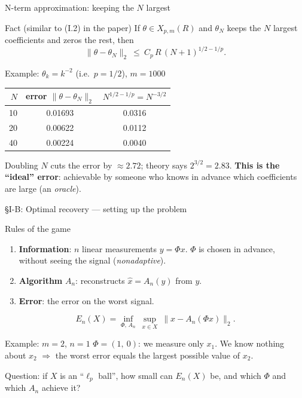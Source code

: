 \documentclass[aspectratio=169,11pt]{beamer}
\newcommand{\en}[1]{\textit{#1}}          %
\newcommand{\norm}[1]{\lVert #1\rVert}
\begin{document}
\begin{frame}{N-term approximation: keeping the $N$ largest}
  \begin{block}{Fact (similar to (I.2) in the paper)}
    If $\theta\in X_{p,m}(R)$ and $\theta_N$ keeps the $N$ largest coefficients and zeros the rest, then
    \[ \norm{\theta-\theta_N}_2\ \le\ C_p\,R\,(N+1)^{1/2-1/p}. \]
  \end{block}
  \begin{exampleblock}{Example: $\theta_k=k^{-2}$ (i.e.\ $p=1/2$), $m=1000$}
    \centering
    \begin{tabular}{@{}rcc@{}}
      \toprule
      $N$ & error $\norm{\theta-\theta_N}_2$ & $N^{1/2-1/p}=N^{-3/2}$ \\
      \midrule
      10 & 0.01693 & 0.0316 \\
      20 & 0.00622 & 0.0112 \\
      40 & 0.00224 & 0.0040 \\
      \bottomrule
    \end{tabular}
  \end{exampleblock}
  Doubling $N$ cuts the error by $\approx2.72$; theory says $2^{3/2}=2.83$.
  \textbf{This is the ``ideal'' error}: achievable by someone who knows in advance which coefficients are large (an \en{oracle}).
\end{frame}

\begin{frame}{\S I-B: Optimal recovery --- setting up the problem}
  \begin{block}{Rules of the game}
    \begin{enumerate}
      \item \textbf{Information}: $n$ linear measurements $y=\Phi x$. $\Phi$ is chosen in advance, without seeing the signal (\en{nonadaptive}).
      \item \textbf{Algorithm} $A_n$: reconstructs $\hat x=A_n(y)$ from $y$.
      \item \textbf{Error}: the error on the worst signal.
    \end{enumerate}
    \[ E_n(X)=\inf_{\Phi,\,A_n}\ \sup_{x\in X}\ \norm{x-A_n(\Phi x)}_2 . \]
  \end{block}
  \begin{exampleblock}{Example: $m=2$, $n=1$}
    $\Phi=(1,\ 0)$: we measure only $x_1$. We know nothing about $x_2$ $\Rightarrow$ the worst error equals the largest possible value of $x_2$.
  \end{exampleblock}
  {\small Question: if $X$ is an ``$\ell_p$ ball'', how small can $E_n(X)$ be, and which $\Phi$ and which $A_n$ achieve it?}
\end{frame}
\end{document}
